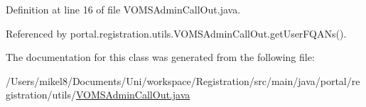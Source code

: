 Definition at line 16 of file VOMSAdminCallOut.java.



Referenced by portal.registration.utils.VOMSAdminCallOut.getUserFQANs().



The documentation for this class was generated from the following file:\begin{DoxyCompactItemize}
\item 
/Users/mikel8/Documents/Uni/workspace/Registration/src/main/java/portal/registration/utils/\hyperlink{VOMSAdminCallOut_8java}{VOMSAdminCallOut.java}\end{DoxyCompactItemize}
